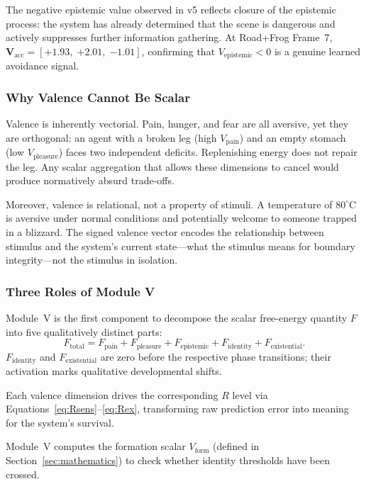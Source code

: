 \documentclass[12pt,a4paper]{article}
\newcommand{\Vform}{V_{\mathrm{form}}}
\newcommand{\vpain}{V_{\mathrm{pain}}}
\newcommand{\vpleasure}{V_{\mathrm{pleasure}}}
\newcommand{\vepi}{V_{\mathrm{epistemic}}}
\newcommand{\pp}[1]{\textbf{#1}}
\begin{document}
The negative epistemic value observed in v5 reflects closure of the
epistemic process: the system has already determined that the scene
is dangerous and actively suppresses further information gathering.
At Road+Frog Frame~7, $\mathbf{V}_{\mathrm{acc}} =
[{+1.93},\;{+2.01},\;{-1.01}]$, confirming that $\vepi < 0$
is a genuine learned avoidance signal.

\subsubsection{Why Valence Cannot Be Scalar}

Valence is inherently vectorial. Pain, hunger, and fear are all aversive, yet
they are orthogonal: an agent with a broken leg (high $\vpain$) and an empty
stomach (low $\vpleasure$) faces two independent deficits. Replenishing energy
does not repair the leg. Any scalar aggregation that allows these dimensions to
cancel would produce normatively absurd trade-offs.

Moreover, valence is relational, not a property of stimuli. A temperature of
$80^\circ$C is aversive under normal conditions and potentially welcome to
someone trapped in a blizzard. The signed valence vector encodes the
relationship between stimulus and the system's current state---what the stimulus
means for boundary integrity---not the stimulus in isolation.

\subsubsection{Three Roles of Module V}

\begin{description}[leftmargin=1.4em]
  \item[\pp{Role~1 --- Free-energy decomposition.}]
    Module~V is the first component to decompose the scalar free-energy quantity
    $F$ into five qualitatively distinct parts:
    \begin{equation}
      F_{\mathrm{total}} = F_{\mathrm{pain}} + F_{\mathrm{pleasure}}
      + F_{\mathrm{epistemic}} + F_{\mathrm{identity}} + F_{\mathrm{existential}}.
      \label{eq:F_decomp}
    \end{equation}
    $F_{\mathrm{identity}}$ and $F_{\mathrm{existential}}$ are zero before the
    respective phase transitions; their activation marks qualitative developmental
    shifts.
  \item[\pp{Role~2 --- $\mathbf{V}\!\to\!R$ mapping.}]
    Each valence dimension drives the corresponding $R$ level via
    Equations~\ref{eq:Rsens}--\ref{eq:Rex}, transforming raw prediction error
    into meaning for the system's survival.
  \item[\pp{Role~3 --- Phase-transition monitoring.}]
    Module~V computes the formation scalar $\Vform$ (defined in
    Section~\ref{sec:mathematics}) to check whether identity thresholds have
    been crossed.
\end{description}
\end{document}
